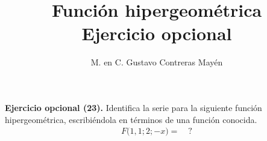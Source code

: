 
\title{Función hipergeométrica \\[0.3em]  \large{Ejercicio opcional} \vspace{-3ex}}
\author{M. en C. Gustavo Contreras Mayén}
\date{ }


\vspace{-4cm}
\maketitle
\fontsize{14}{14}\selectfont

\noindent
\textbf{Ejercicio opcional (23).} Identifica la serie para la siguiente función hipergeométrica, escribiéndola en términos de una función conocida.
\begin{align*}
F \big( 1, 1; 2; - x \big) = \quad ?
\end{align*}

